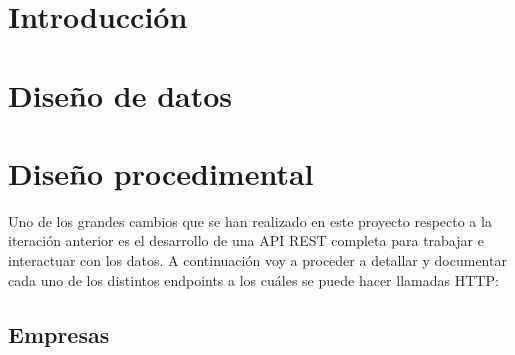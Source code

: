 
\section{Introducción}

\section{Diseño de datos}

\section{Diseño procedimental}

Uno de los grandes cambios que se han realizado en este proyecto respecto a la iteración anterior es el desarrollo de una API REST completa para trabajar e interactuar con los datos. A continuación voy a proceder a detallar y documentar cada uno de los distintos endpoints a los cuáles se puede hacer llamadas HTTP:


\subsection{Empresas}

